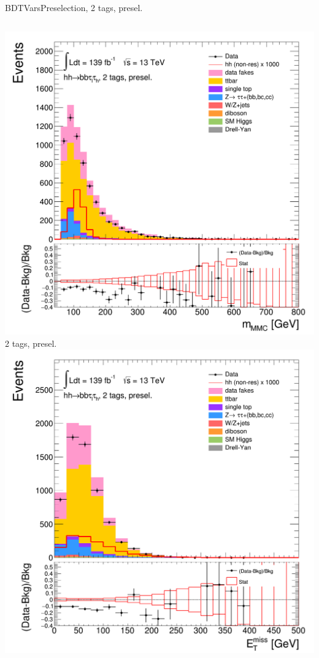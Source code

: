 \begin{frame}{BDTVarsPreselection, 2 tags, presel.}
  \begin{columns}[c]
    \centering\includegraphics[width=\textwidth]{C_2tag2pjet_0ptv_mMMC}\\
    2 tags, presel.
    \centering\includegraphics[width=\textwidth]{C_2tag2pjet_0ptv_MET}\\

\end{columns}
\end{frame}
